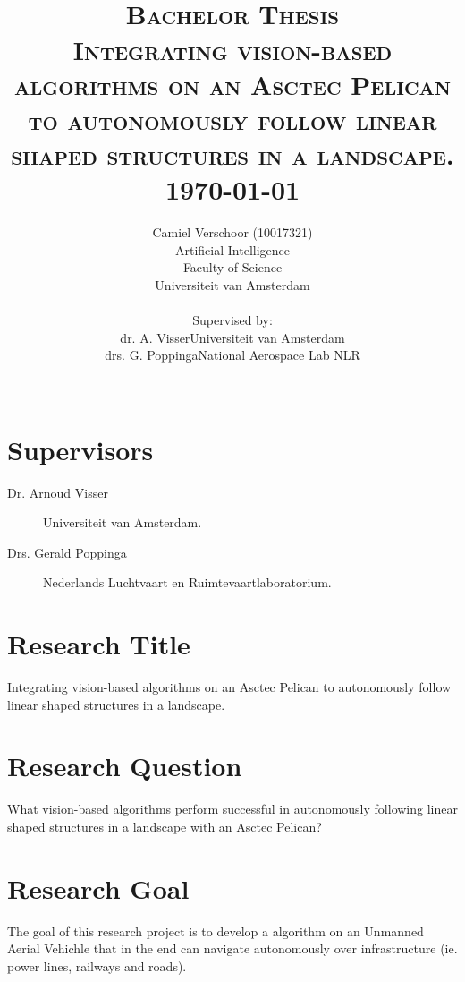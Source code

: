 \documentclass[11pt]{article}
\title{
\HRule{0.5pt} \\
\LARGE \textbf{\textsc{Bachelor Thesis}}\\[0.5cm]
\normalsize \textsc{Integrating vision-based algorithms on an Asctec Pelican to autonomously follow linear shaped structures in a landscape.}
\HRule{2pt}\\ [0.5cm]
\normalsize
\today\\[1cm]
}
\author{
Camiel Verschoor (10017321)\\
Artificial Intelligence\\
Faculty of Science\\
Universiteit van Amsterdam\\[0.5cm]
\begin{tabular}{l l}
Supervised by: &\\
dr. A. Visser & Universiteit van Amsterdam\\
drs. G. Poppinga & National Aerospace Lab NLR\\
\end{tabular}\\[0.5cm]
}
\makeatletter
\def\printtitle{
    {\centering \@title\par}}
\def\printauthor{
    {\centering \large \@author}}
\makeatother
\begin{document}
\thispagestyle{empty}
\printtitle                  
\printauthor
\vfill
\newpage

\setcounter{page}{1}
\section{Supervisors}
\begin{description}
\item[Dr. Arnoud Visser] Universiteit van Amsterdam.
\item[Drs. Gerald Poppinga] Nederlands Luchtvaart en Ruimtevaartlaboratorium.
\end{description}
\section{Research Title}
Integrating vision-based algorithms on an Asctec Pelican to autonomously follow linear shaped structures in a landscape.
\section{Research Question}
What vision-based algorithms perform successful in autonomously following linear shaped structures in a landscape with an Asctec Pelican?
\section{Research Goal}
The goal of this research project is to develop a algorithm on an Unmanned Aerial Vehichle that in the end can navigate autonomously over infrastructure (ie. power lines, railways and roads). 
\end{document}
